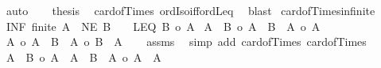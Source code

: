 \begin{isabellebody}
\ auto\isanewline
\ \ \isamarkupfalse%
\ {\isacharquery}{\kern0pt}thesis\ \isamarkupfalse%
\ card{\isacharunderscore}{\kern0pt}of{\isacharunderscore}{\kern0pt}Times{}\ ordIso{\isacharunderscore}{\kern0pt}iff{\isacharunderscore}{\kern0pt}ordLeq\ \isamarkupfalse%
\ blast\isanewline
{}\isamarkupfalse%
%
\endisatagproof
{\isafoldproof}%
%
\isadelimproof
\isanewline
%
\endisadelimproof
\isanewline
{}\isamarkupfalse%
\ card{\isacharunderscore}{\kern0pt}of{\isacharunderscore}{\kern0pt}Times{\isacharunderscore}{\kern0pt}infinite{\isacharcolon}{\kern0pt}\isanewline
{}\ INF{\isacharcolon}{\kern0pt}\ {\isachardoublequoteopen}{\isasymnot}finite\ A{\isachardoublequoteclose}\ \ NE{\isacharcolon}{\kern0pt}\ {\isachardoublequoteopen}B\ {\isasymnoteq}\ {\isacharbraceleft}{\kern0pt}{\isacharbraceright}{\kern0pt}{\isachardoublequoteclose}\ \ LEQ{\isacharcolon}{\kern0pt}\ {\isachardoublequoteopen}{\isacharbar}{\kern0pt}B{\isacharbar}{\kern0pt}\ {\isasymle}o\ {\isacharbar}{\kern0pt}A{\isacharbar}{\kern0pt}{\isachardoublequoteclose}\isanewline
{}\ {\isachardoublequoteopen}{\isacharbar}{\kern0pt}A\ {\isasymtimes}\ B{\isacharbar}{\kern0pt}\ {\isacharequal}{\kern0pt}o\ {\isacharbar}{\kern0pt}A{\isacharbar}{\kern0pt}\ {\isasymand}\ {\isacharbar}{\kern0pt}B\ {\isasymtimes}\ A{\isacharbar}{\kern0pt}\ {\isacharequal}{\kern0pt}o\ {\isacharbar}{\kern0pt}A{\isacharbar}{\kern0pt}{\isachardoublequoteclose}\isanewline
%
\isadelimproof
%
\endisadelimproof
%
\isatagproof
{}\isamarkupfalse%
{\isacharminus}{\kern0pt}\isanewline
\ \ \isamarkupfalse%
\ {\isachardoublequoteopen}{\isacharbar}{\kern0pt}A{\isacharbar}{\kern0pt}\ {\isasymle}o\ {\isacharbar}{\kern0pt}A\ {\isasymtimes}\ B{\isacharbar}{\kern0pt}\ {\isasymand}\ {\isacharbar}{\kern0pt}A{\isacharbar}{\kern0pt}\ {\isasymle}o\ {\isacharbar}{\kern0pt}B\ {\isasymtimes}\ A{\isacharbar}{\kern0pt}{\isachardoublequoteclose}\isanewline
\ \ \isamarkupfalse%
\ assms\ \isamarkupfalse%
\ {\isacharparenleft}{\kern0pt}simp\ add{\isacharcolon}{\kern0pt}\ card{\isacharunderscore}{\kern0pt}of{\isacharunderscore}{\kern0pt}Times{}\ card{\isacharunderscore}{\kern0pt}of{\isacharunderscore}{\kern0pt}Times{}{\isacharparenright}{\kern0pt}\isanewline
\ \ \isamarkupfalse%
\isanewline
\ \ \isacommand{{\isacharbraceleft}{\kern0pt}}\isamarkupfalse%
\isamarkupfalse%
\ {\isachardoublequoteopen}{\isacharbar}{\kern0pt}A\ {\isasymtimes}\ B{\isacharbar}{\kern0pt}\ {\isasymle}o\ {\isacharbar}{\kern0pt}A\ {\isasymtimes}\ A{\isacharbar}{\kern0pt}\ {\isasymand}\ {\isacharbar}{\kern0pt}B\ {\isasymtimes}\ A{\isacharbar}{\kern0pt}\ {\isasymle}o\ {\isacharbar}{\kern0pt}A\ {\isasymtimes}\ A{\isacharbar}{\kern0pt}{\isachardoublequoteclose}\isanewline

\end{isabellebody}
